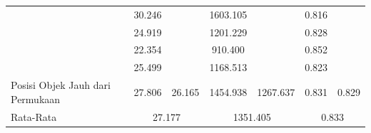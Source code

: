 \begin{table}[]
\begin{tabular}{|l|cc|cc|cc|}
                                                      & \multicolumn{1}{c|}{\cellcolor[HTML]{FFFFFF}30.246} & \cellcolor[HTML]{FFFFFF}                         & \multicolumn{1}{c|}{\cellcolor[HTML]{FFFFFF}1603.105} & \cellcolor[HTML]{FFFFFF}                           & \multicolumn{1}{c|}{\cellcolor[HTML]{FFFFFF}0.816} & \cellcolor[HTML]{FFFFFF}                        \\ \cline{2-2} \cline{4-4} \cline{6-6}
                                                      & \multicolumn{1}{c|}{\cellcolor[HTML]{FFFFFF}24.919} & \cellcolor[HTML]{FFFFFF}                         & \multicolumn{1}{c|}{\cellcolor[HTML]{FFFFFF}1201.229} & \cellcolor[HTML]{FFFFFF}                           & \multicolumn{1}{c|}{\cellcolor[HTML]{FFFFFF}0.828} & \cellcolor[HTML]{FFFFFF}                        \\ \cline{2-2} \cline{4-4} \cline{6-6}
                                                      & \multicolumn{1}{c|}{\cellcolor[HTML]{FFFFFF}22.354} & \cellcolor[HTML]{FFFFFF}                         & \multicolumn{1}{c|}{\cellcolor[HTML]{FFFFFF}910.400}  & \cellcolor[HTML]{FFFFFF}                           & \multicolumn{1}{c|}{\cellcolor[HTML]{FFFFFF}0.852} & \cellcolor[HTML]{FFFFFF}                        \\ \cline{2-2} \cline{4-4} \cline{6-6}
                                                      & \multicolumn{1}{c|}{\cellcolor[HTML]{FFFFFF}25.499} & \cellcolor[HTML]{FFFFFF}                         & \multicolumn{1}{c|}{\cellcolor[HTML]{FFFFFF}1168.513} & \cellcolor[HTML]{FFFFFF}                           & \multicolumn{1}{c|}{\cellcolor[HTML]{FFFFFF}0.823} & \cellcolor[HTML]{FFFFFF}                        \\ \cline{2-2} \cline{4-4} \cline{6-6}
  \multirow{-5}{*}{Posisi Objek Jauh dari Permukaan}  & \multicolumn{1}{c|}{\cellcolor[HTML]{FFFFFF}27.806} & \multirow{-5}{*}{\cellcolor[HTML]{FFFFFF}26.165} & \multicolumn{1}{c|}{\cellcolor[HTML]{FFFFFF}1454.938} & \multirow{-5}{*}{\cellcolor[HTML]{FFFFFF}1267.637} & \multicolumn{1}{c|}{\cellcolor[HTML]{FFFFFF}0.831} & \multirow{-5}{*}{\cellcolor[HTML]{FFFFFF}0.829} \\ \hline
  Rata-Rata                                           & \multicolumn{2}{c|}{\cellcolor[HTML]{FFFFFF}27.177}                                                    & \multicolumn{2}{c|}{1351.405}                                                                              & \multicolumn{2}{c|}{0.833}                                                                           \\ \hline
  \end{tabular}
\end{table}


